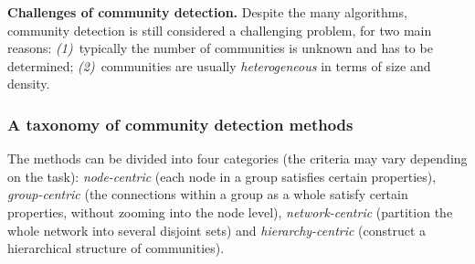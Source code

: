 \documentclass[11pt,a4paper]{article}
\theoremstyle{definition}
\begin{document}
\textbf{Challenges of community detection.} Despite the many algorithms, community detection is still
considered a challenging problem, for two main reasons: \emph{(1)}~typically the number of communities
is unknown and has to be determined; \emph{(2)}~communities are usually \emph{heterogeneous} in terms
of size and density.

\subsubsection{A taxonomy of community detection methods}

The methods can be divided into four categories (the criteria may vary depending on the task):
\emph{node-centric} (each node in a group satisfies certain properties), \emph{group-centric} (the
connections within a group as a whole satisfy certain properties, without zooming into the node
level), \emph{network-centric} (partition the whole network into several disjoint sets) and
\emph{hierarchy-centric} (construct a hierarchical structure of communities).
\end{document}
